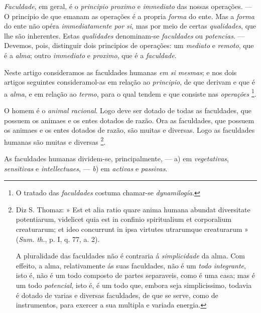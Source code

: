 
\emph{Faculdade}, em geral, é o \emph{principio proximo} e \emph{immediato} das nossas operações. --- O principio de que emanam as operações é a propria \emph{forma} do ente. Mas a \emph{forma} do ente não opéra \emph{immediatamente por si}, mas por meio de certas \emph{qualidades}, que lhe são inherentes. Estas \emph{qualidades} denominam-se \emph{faculdades} ou \emph{potencias}. --- Devemos, pois, distinguir dois principios de operações: um \emph{mediato} e \emph{remoto}, que é a \emph{alma}; outro \emph{immediato} e \emph{proximo}, que é a \emph{faculdade}.

Neste artigo consideramos as faculdades humanas \emph{em si mesmas}; e nos dois artigos seguintes consideramol-as em relação ao \emph{principio}, de que derivam e que é a \emph{alma}, e em relação ao \emph{termo}, para o qual tendem e que consiste nas \emph{operações} \footnote{O tratado das \emph{faculdades} costuma chamar-se \emph{dynamilogía}.}.


 
O homem é o \emph{animal racional}. Logo deve ser dotado de todas as faculdades, que possuem os animaes e os entes dotados de razão. Ora as faculdades, que possuem os animaes e os entes dotados de razão, são muitas e diversas. Logo as faculdades humanas são muitas e diversas \footnote{Diz S. Thomaz: » Est et alia ratio quare anima humana abundat diversitate potentiarum, videlicet quia est in confinio spiritualium et corporalium creaturarum; et ideo concurrunt in ipsa virtutes utrarumque creaturarum » (\emph{Sum. th.}, p. I, q. 77, a. 2).\par A pluralidade das faculdades não é contraria á \emph{simplicidade} da alma. Com effeito, a alma, relativamente ás suas faculdades, não é um \emph{todo integrante}, isto é, não é um todo composto de partes separaveis, como é uma casa; mas é um todo \emph{potencial}, isto é, é um todo que, embora seja simplicissimo, todavia é dotado de varias e diversas faculdades, de que se serve, como de instrumentos, para exercer a sua multipla e variada energia.}.


As faculdades humanas dividem-se, principalmente, --- a) em \emph{vegetativas}, \emph{sensitivas} e \emph{intellectuaes}, --- \emph{b}) em \emph{activas} e \emph{passivas}.

